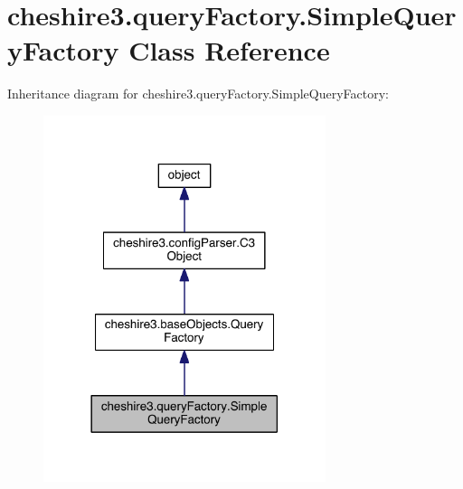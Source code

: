 \hypertarget{classcheshire3_1_1query_factory_1_1_simple_query_factory}{\section{cheshire3.\-query\-Factory.\-Simple\-Query\-Factory Class Reference}
\label{classcheshire3_1_1query_factory_1_1_simple_query_factory}
}


Inheritance diagram for cheshire3.\-query\-Factory.\-Simple\-Query\-Factory\-:
\nopagebreak
\begin{figure}[H]
\begin{center}
\leavevmode
\includegraphics[width=234pt]{classcheshire3_1_1query_factory_1_1_simple_query_factory__inherit__graph}
\end{center}
\end{figure}


